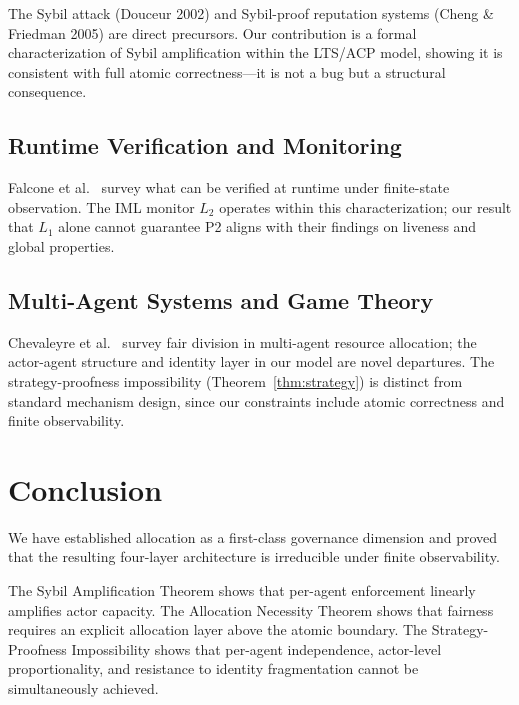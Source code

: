 \documentclass[11pt]{article}
\newcommand{\Layer}[1]{L_{#1}}
\begin{document}
The Sybil attack (Douceur 2002) and Sybil-proof reputation systems (Cheng \& Friedman 2005) are direct precursors. Our contribution is a formal characterization of Sybil amplification within the LTS/ACP model, showing it is consistent with full atomic correctness---it is not a bug but a structural consequence.

\subsection{Runtime Verification and Monitoring}

Falcone et al.~\cite{falcone2012} survey what can be verified at runtime under finite-state observation. The IML monitor $\Layer{2}$ operates within this characterization; our result that $\Layer{1}$ alone cannot guarantee P2 aligns with their findings on liveness and global properties.

\subsection{Multi-Agent Systems and Game Theory}

Chevaleyre et al.~\cite{chevaleyre06} survey fair division in multi-agent resource allocation; the actor-agent structure and identity layer in our model are novel departures. The strategy-proofness impossibility (Theorem~\ref{thm:strategy}) is distinct from standard mechanism design, since our constraints include atomic correctness and finite observability.

\section{Conclusion}
\label{sec:conclusion}

We have established allocation as a first-class governance dimension and proved that the resulting four-layer architecture is irreducible under finite observability.

The Sybil Amplification Theorem shows that per-agent enforcement linearly amplifies actor capacity. The Allocation Necessity Theorem shows that fairness requires an explicit allocation layer above the atomic boundary. The Strategy-Proofness Impossibility shows that per-agent independence, actor-level proportionality, and resistance to identity fragmentation cannot be simultaneously achieved.
\end{document}
